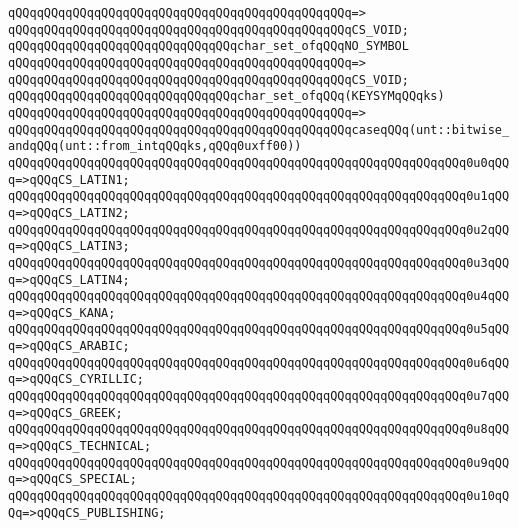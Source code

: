 \verb|qQQqqQQqqQQqqQQqqQQqqQQqqQQqqQQqqQQqqQQqqQQqqQQq=>|\newline
\verb|qQQqqQQqqQQqqQQqqQQqqQQqqQQqqQQqqQQqqQQqqQQqqQQqCS_VOID;|\newline
\newline
\verb|qQQqqQQqqQQqqQQqqQQqqQQqqQQqqQQqchar_set_ofqQQqNO_SYMBOL|\newline
\verb|qQQqqQQqqQQqqQQqqQQqqQQqqQQqqQQqqQQqqQQqqQQqqQQq=>|\newline
\verb|qQQqqQQqqQQqqQQqqQQqqQQqqQQqqQQqqQQqqQQqqQQqqQQqCS_VOID;|\newline
\newline
\verb|qQQqqQQqqQQqqQQqqQQqqQQqqQQqqQQqchar_set_ofqQQq(KEYSYMqQQqks)|\newline
\verb|qQQqqQQqqQQqqQQqqQQqqQQqqQQqqQQqqQQqqQQqqQQqqQQq=>|\newline
\verb|qQQqqQQqqQQqqQQqqQQqqQQqqQQqqQQqqQQqqQQqqQQqqQQqcaseqQQq(unt::bitwise_andqQQq(unt::from_intqQQqks,qQQq0uxff00))|\newline
\verb|qQQqqQQqqQQqqQQqqQQqqQQqqQQqqQQqqQQqqQQqqQQqqQQqqQQqqQQqqQQqqQQq0u0qQQq=>qQQqCS_LATIN1;|\newline
\verb|qQQqqQQqqQQqqQQqqQQqqQQqqQQqqQQqqQQqqQQqqQQqqQQqqQQqqQQqqQQqqQQq0u1qQQq=>qQQqCS_LATIN2;|\newline
\verb|qQQqqQQqqQQqqQQqqQQqqQQqqQQqqQQqqQQqqQQqqQQqqQQqqQQqqQQqqQQqqQQq0u2qQQq=>qQQqCS_LATIN3;|\newline
\verb|qQQqqQQqqQQqqQQqqQQqqQQqqQQqqQQqqQQqqQQqqQQqqQQqqQQqqQQqqQQqqQQq0u3qQQq=>qQQqCS_LATIN4;|\newline
\verb|qQQqqQQqqQQqqQQqqQQqqQQqqQQqqQQqqQQqqQQqqQQqqQQqqQQqqQQqqQQqqQQq0u4qQQq=>qQQqCS_KANA;|\newline
\verb|qQQqqQQqqQQqqQQqqQQqqQQqqQQqqQQqqQQqqQQqqQQqqQQqqQQqqQQqqQQqqQQq0u5qQQq=>qQQqCS_ARABIC;|\newline
\verb|qQQqqQQqqQQqqQQqqQQqqQQqqQQqqQQqqQQqqQQqqQQqqQQqqQQqqQQqqQQqqQQq0u6qQQq=>qQQqCS_CYRILLIC;|\newline
\verb|qQQqqQQqqQQqqQQqqQQqqQQqqQQqqQQqqQQqqQQqqQQqqQQqqQQqqQQqqQQqqQQq0u7qQQq=>qQQqCS_GREEK;|\newline
\verb|qQQqqQQqqQQqqQQqqQQqqQQqqQQqqQQqqQQqqQQqqQQqqQQqqQQqqQQqqQQqqQQq0u8qQQq=>qQQqCS_TECHNICAL;|\newline
\verb|qQQqqQQqqQQqqQQqqQQqqQQqqQQqqQQqqQQqqQQqqQQqqQQqqQQqqQQqqQQqqQQq0u9qQQq=>qQQqCS_SPECIAL;|\newline
\verb|qQQqqQQqqQQqqQQqqQQqqQQqqQQqqQQqqQQqqQQqqQQqqQQqqQQqqQQqqQQqqQQq0u10qQQq=>qQQqCS_PUBLISHING;|\newline

